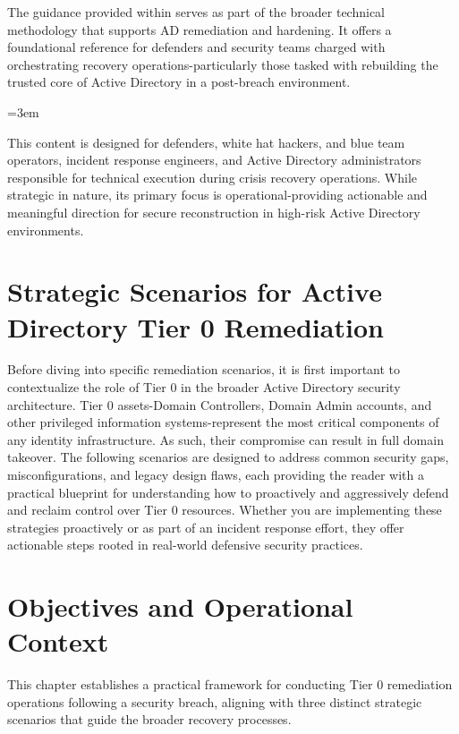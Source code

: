 The guidance provided within serves as part of the broader technical methodology that supports AD remediation and hardening. It offers a foundational reference for defenders and security teams charged with orchestrating recovery operations-particularly those tasked with rebuilding the trusted core of Active Directory in a post-breach environment.

{\emergencystretch=3em
}

This content is designed for defenders, white hat hackers, and blue team operators, incident response engineers, and Active Directory administrators responsible for technical execution during crisis recovery operations. While strategic in nature, its primary focus is operational-providing actionable and meaningful direction for secure reconstruction in high-risk Active Directory environments.

\section{Strategic Scenarios for Active Directory Tier 0 Remediation}
Before diving into specific remediation scenarios, it is first important to contextualize the role of Tier 0 in the broader Active Directory security architecture. Tier 0 assets-Domain Controllers, Domain Admin accounts, and other privileged information systems-represent the most critical components of any identity infrastructure. As such, their compromise can result in full domain takeover. The following scenarios are designed to address common security gaps, misconfigurations, and legacy design flaws, each providing the reader with a practical blueprint for understanding how to proactively and aggressively defend and reclaim control over Tier 0 resources. Whether you are implementing these strategies proactively or as part of an incident response effort, they offer actionable steps rooted in real-world defensive security practices.

\section{Objectives and Operational Context}
This chapter establishes a practical framework for conducting Tier 0 remediation operations following a security breach, aligning with three distinct strategic scenarios that guide the broader recovery processes.

